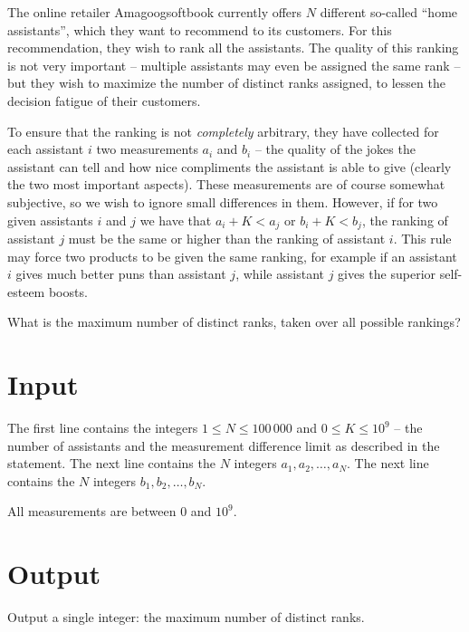 The online retailer Amagoogsoftbook currently offers $N$ different so-called ``home assistants'', which they want to recommend to its customers.
For this recommendation, they wish to rank all the assistants.
The quality of this ranking is not very important -- multiple assistants may even be assigned the same rank -- but they wish to maximize the number of distinct ranks assigned, to lessen the decision fatigue of their customers.

To ensure that the ranking is not \emph{completely} arbitrary, they have collected for each assistant $i$ two measurements $a_i$ and $b_i$ -- the quality of the jokes the assistant can tell and how nice compliments the assistant is able to give (clearly the two most important aspects).
These measurements are of course somewhat subjective, so we wish to ignore small differences in them.
However, if for two given assistants $i$ and $j$ we have that $a_i + K < a_j$ or $b_i + K < b_j$, the ranking of assistant $j$ must be the same or higher than the ranking of assistant $i$.
This rule may force two products to be given the same ranking, for example if an assistant $i$ gives much better puns than assistant $j$, while assistant $j$ gives the superior self-esteem boosts.

What is the maximum number of distinct ranks, taken over all possible rankings?

\section*{Input}
The first line contains the integers $1 \le N \le 100\,000$ and $0 \le K \le 10^9$ -- the number of assistants and the measurement difference limit as described in the statement.
The next line contains the $N$ integers $a_1, a_2, \dots, a_N$.
The next line contains the $N$ integers $b_1, b_2, \dots, b_N$.

All measurements are between $0$ and $10^9$.

\section*{Output}
Output a single integer: the maximum number of distinct ranks.
